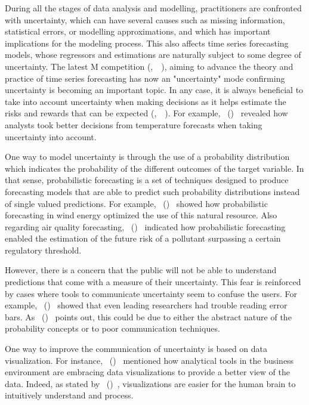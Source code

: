 \documentclass[a4paper,3p,sort&compress]{elsarticle}
\DeclareRobustCommand{\citeext}[1]{\citeauthor{#1},~\citeyear{#1}~\cite{#1}}
\DeclareRobustCommand{\citeextp}[1]{\citeauthor{#1}~(\citeyear{#1})~\cite{#1}}
\begin{document}
During all the stages of data analysis and modelling, practitioners are
confronted with uncertainty, which can have several causes such as missing
information, statistical errors, or modelling approximations, and which has
important implications for the modeling process. This also affects time series
forecasting models, whose regressors and estimations are naturally subject to
some degree of uncertainty. The latest M competition (\citeext{makridakis_m5_2022}), 
aiming to advance the 
theory and practice of time series forecasting has now an "uncertainty" 
mode confirming uncertainty is becoming an important topic. In any case, 
it is always beneficial to take into
account uncertainty when making decisions as it helps estimate the risks and
rewards that can be expected (\citeext{padilla_uncertainty_2021}).
For example, \citeextp{roulston_laboratory_2006} revealed how
analysts took better decisions from temperature forecasts when taking
uncertainty into account. 

One way to model uncertainty is through the use of a probability distribution
which indicates the probability of the different outcomes of the target
variable. In that sense, probabilistic forecasting is a set of techniques
designed to produce forecasting models that are able to predict such probability
distributions instead of single valued predictions. For example, 
\citeextp{pinson_non-parametric_2007} showed how probabilistic forecasting in wind
energy optimized the use of this natural resource. Also regarding air
quality forecasting, \citeextp{vasseur_comparing_2021} indicated 
how probabilistic
forecasting enabled the estimation of the future risk of a pollutant surpassing
a certain regulatory threshold.

However, there is a concern that the public will not be able to understand
predictions that come with a measure of their uncertainty. This fear is
reinforced by cases where tools to communicate uncertainty seem to confuse the
users. For example, \citeextp{belia_researchers_2005} showed that even
leading researchers had trouble reading error bars. As 
\citeextp{padilla_uncertainty_2021} points out, this could be due to either the
abstract nature of the probability concepts or to poor communication techniques.

One way to improve the communication of uncertainty is based on data
visualization. For instance, \citeextp{cota_importance_2014}
mentioned how analytical tools in the business environment are embracing data
visualizations to provide a better view of the data. Indeed, as stated by 
\citeextp{islam_overview_2019}, visualizations are easier for the human brain
to intuitively understand and process.
\end{document}

